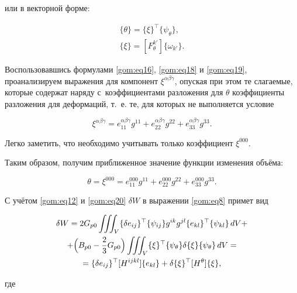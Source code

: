 или в векторной форме:

\begin{gather}

\label{gom:eq20}

\{\theta\}=\{\xi\}^\top\{\psi_{\theta}\}, \\

\label{gom:eq21}

\{\xi\}=[F_{\theta}^{k'}]\{\omega_{k'}\}. 

\end{gather}



Воспользовавшись формулами \eqref{gom:eq16}, \eqref{gom:eq18} и \eqref{gom:eq19}, проанализируем выражения для компонент $\xi^{\alpha\beta\gamma}$, опуская при этом те слагаемые, которые содержат наряду с~коэффициентами разложения для $\theta$ коэффициенты разложения для деформаций, т.~е. те, для которых не выполняется условие

$$\xi^{\alpha\beta\gamma}=e_{11}^{\alpha\beta\gamma}g^{11}+e_{22}^{\alpha\beta\gamma}g^{22}+e_{33}^{\alpha\beta\gamma}g^{33}.$$



Легко заметить, что необходимо учитывать только коэффициент $\xi^{000}$. 

Таким образом, получим приближенное значение функции изменения объёма:

$$\theta=\xi^{000}=e_{11}^{000}g^{11}+e_{22}^{000}g^{22}+e_{33}^{000}g^{33}.$$



С учётом \eqref{gom:eq12} и \eqref{gom:eq20} $\delta W$ в выражении \eqref{gom:eq8} примет вид

\begin{multline}

\label{gom:eq22}

\delta W=2G_{p0}\iiint_{V}\{\delta e_{ij}\}^\top\{\psi_{ij}\}g^{ik}g^{jl}\{e_{kl}\}^\top\{\psi_{kl}\}\,dV+

\\

+\Bigl(B_{p0}-\frac{2}{3}G_{p0}\Bigr)\iiint_{V}\{\xi\}^\top\{\psi_{\theta}\}\delta \{\xi\}\{\psi_{\theta}\}\,dV=

\\

=\{\delta e_{ij}\}^\top[H^{ijkl}]\{e_{kl}\}+\delta \{\xi\}^\top[H^{\theta}]\{\xi\},

\end{multline}

где

